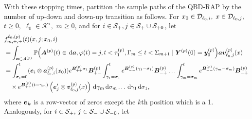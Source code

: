 With these stopping times, partition the sample paths of the QBD-RAP by the number of up-down and down-up transition as follows. For \(x_0\in\mathcal{D}_{\ell_0,i},\) \(x\in\mathcal{D}_{\ell_0,j},\) \(t\geq0,\) \(\ell_0\in\mathcal K^\circ,\) \(m\geq 0\), and for \(i\in\mathcal{S}_+,j\in\mathcal S_+\cup\mathcal S_{+0}\), let 
\begin{align}
	&f^{\ell_0,(p)}_{m,+,+}(t)( x,j; x_0,i) 
	\\&=\int_{\boldsymbol a \in\mathcal A^{(p)}}\mathbb P\Big(\boldsymbol A^{(p)}(t)\in \, \mathrm{d} \boldsymbol a, \varphi(t) = j, t<\tau_1^{(p)}, \Gamma_m\leq t<\Sigma_{m+1} \nonumber
	\mid \boldsymbol Y^{(p)}(0)=\boldsymbol y_0^{(p)}\Big)
	\boldsymbol a{\boldsymbol v}_{\ell_0,j}^{(p)}(x) \nonumber
	\\
	&=\int_{\sigma_1=0}^t (\boldsymbol e_i\otimes \boldsymbol  a_{\ell_0,i}^{(p)}(x_0)) e^{\boldsymbol{B}^{(p)}_{++}\sigma_1}\boldsymbol{B}^{(p)}_{+-}	\nonumber
	\int_{\gamma_1=\sigma_1}^{t} e^{\boldsymbol{B}^{(p)}_{--}(\gamma_1-\sigma_1)}\boldsymbol{B}^{(p)}_{-+}
	\hdots 
	 \int_{\gamma_m=\sigma_{m}}^{t} e^{\boldsymbol{B}^{(p)}_{--}(\gamma_m-\sigma_{m})}\boldsymbol{B}^{(p)}_{-+}\\&\quad\times
	e^{\boldsymbol{B}^{(p)}_{++}(t-\gamma_m)}\left(\boldsymbol e_j'{}  \otimes {\boldsymbol v}_{\ell_0,j}^{(p)}(x)\right) 
	\, \mathrm{d} \gamma_m\, \mathrm{d} \sigma_m\dots \, \mathrm{d} \gamma_1\, \mathrm{d} \sigma_1 , \label{eqn: approx end conv}
\end{align}
where \(\boldsymbol e_k\) is a row-vector of zeros except the \(k\)th position which is a 1. 
Analogously, for \(i\in\mathcal S_+ ,\,j\in\mathcal{S}_{-}\cup\mathcal S_{-0}\), let 
